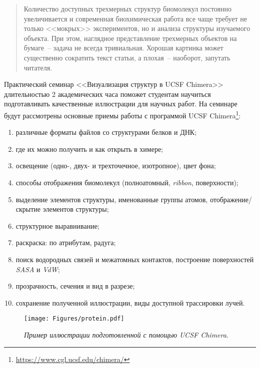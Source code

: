\begin{abstract}
Количество доступных трехмерных структур биомолекул постоянно увеличивается и современная биохимическая работа все чаще требует не только <<мокрых>> экспериментов, но и анализа структуры изучаемого объекта. При этом, наглядное представление трехмерных объектов на бумаге~-- задача не всегда тривиальная. Хорошая картинка может существенно сократить текст статьи, а плохая~-- наоборот, запутать читателя. 
\end{abstract}

Практический семинар <<Визуализация структур в UCSF Chimera>> длительностью 2 академических часа поможет студентам научиться подготавливать качественные иллюстрации для научных работ. На семинаре будут рассмотрены основные приемы работы с программой UCSF Chimera\footnote{\url{https://www.cgl.ucsf.edu/chimera/}}:
\begin{enumerate}
    \item различные форматы файлов со структурами белков и ДНК; %
    \item где их можно получить и как открыть в химере; %
    \item освещение (одно-, двух- и трехточечное, изотропное), цвет фона; %
    \item способы отображения биомолекул (полноатомный, \textit{ribbon}, поверхности); %
    \item выделение элементов структуры, именованные группы атомов, отображение/скрытие элементов структуры;
    \item структурное выравнивание;
    \item раскраска: по атрибутам, радуга; %
    \item поиск водородных связей и межатомных контактов, построение поверхностей \textit{SASA} и \textit{VdW};
    \item прозрачность, сечения и вид в разрезе;
    \item сохранение полученной иллюстрации, виды доступной трассировки лучей.
\end{enumerate}
\hfill
\begin{figure}[h!]
  \texttt{[image: Figures/protein.pdf]}
  \caption{\textit{Пример иллюстрации подготовленной с помощью UCSF Chimera.}}
  \label{fig:smug}
\end{figure}